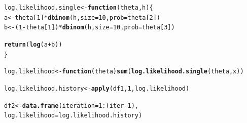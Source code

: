 \documentclass[11pt, a4paper]{article}\usepackage[]{graphicx}\usepackage[]{xcolor}
\makeatletter
\newcommand{\hlnum}[1]{\textcolor[rgb]{0.686,0.059,0.569}{#1}}%
\newcommand{\hlopt}[1]{\textcolor[rgb]{0,0,0}{#1}}%
\newcommand{\hldef}[1]{\textcolor[rgb]{0.345,0.345,0.345}{#1}}%
\newcommand{\hlkwa}[1]{\textcolor[rgb]{0.161,0.373,0.58}{\textbf{#1}}}%
\newcommand{\hlkwb}[1]{\textcolor[rgb]{0.69,0.353,0.396}{#1}}%
\newcommand{\hlkwc}[1]{\textcolor[rgb]{0.333,0.667,0.333}{#1}}%
\newcommand{\hlkwd}[1]{\textcolor[rgb]{0.737,0.353,0.396}{\textbf{#1}}}%
\newenvironment{kframe}{%
 \def\at@end@of@kframe{}%
 \ifinner\ifhmode%
  \def\at@end@of@kframe{\end{minipage}}%
  \begin{minipage}{\columnwidth}%
 \fi\fi%
 \def\FrameCommand##1{\hskip\@totalleftmargin \hskip-\fboxsep
 \colorbox{shadecolor}{##1}\hskip-\fboxsep
     \hskip-\linewidth \hskip-\@totalleftmargin \hskip\columnwidth}%
 \MakeFramed {\advance\hsize-\width
   \@totalleftmargin\z@ \linewidth\hsize
   \@setminipage}}%
 {\par\unskip\endMakeFramed%
 \at@end@of@kframe}
\newenvironment{knitrout}{}{} %
\makeatother
\begin{document}
\begin{enumerate}
\begin{knitrout}
\color{fgcolor}\begin{kframe}
\begin{alltt}
\hldef{log.likelihood.single} \hlkwb{<-} \hlkwa{function}\hldef{(}\hlkwc{theta}\hldef{,} \hlkwc{h}\hldef{)\{}
  \hldef{a} \hlkwb{<-} \hldef{theta[}\hlnum{1}\hldef{]} \hlopt{*} \hlkwd{dbinom}\hldef{(h,} \hlkwc{size} \hldef{=} \hlnum{10}\hldef{,} \hlkwc{prob} \hldef{= theta[}\hlnum{2}\hldef{])}
  \hldef{b} \hlkwb{<-} \hldef{(}\hlnum{1} \hlopt{-} \hldef{theta[}\hlnum{1}\hldef{])} \hlopt{*} \hlkwd{dbinom}\hldef{(h,} \hlkwc{size} \hldef{=} \hlnum{10}\hldef{,} \hlkwc{prob} \hldef{= theta[}\hlnum{3}\hldef{])}

  \hlkwd{return}\hldef{(}\hlkwd{log}\hldef{(a}\hlopt{+}\hldef{b))}
\hldef{\}}
\end{alltt}
\end{kframe}
\end{knitrout}

\begin{knitrout}
\color{fgcolor}\begin{kframe}
\begin{alltt}
\hldef{log.likelihood} \hlkwb{<-} \hlkwa{function}\hldef{(}\hlkwc{theta}\hldef{)} \hlkwd{sum}\hldef{(}\hlkwd{log.likelihood.single}\hldef{(theta, x))}
\end{alltt}
\end{kframe}
\end{knitrout}

\begin{knitrout}
\color{fgcolor}\begin{kframe}
\begin{alltt}
\hldef{log.likelihood.history} \hlkwb{<-} \hlkwd{apply}\hldef{(df1,} \hlnum{1}\hldef{, log.likelihood)}
\end{alltt}
\end{kframe}
\end{knitrout}



\begin{knitrout}
\color{fgcolor}\begin{kframe}
\begin{alltt}
\hldef{df2} \hlkwb{<-} \hlkwd{data.frame}\hldef{(}\hlkwc{iteration} \hldef{=} \hlnum{1}\hlopt{:}\hldef{(iter}\hlopt{-}\hlnum{1}\hldef{),}
           \hlkwc{log.likelihood} \hldef{= log.likelihood.history)}
\end{alltt}
\end{kframe}
\end{knitrout}


\end{enumerate}
\end{document}
